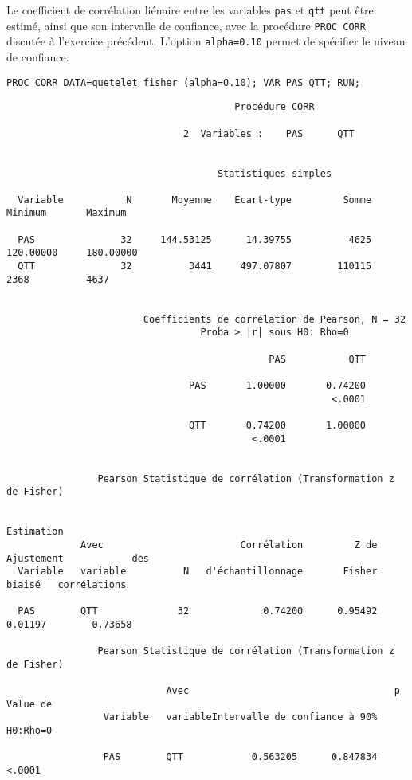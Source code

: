 Le coefficient de corrélation liénaire entre les variables \texttt{pas} et
\texttt{qtt} peut être estimé, ainsi que son intervalle de confiance, avec
la procédure \texttt{PROC CORR} discutée à l'exercice précédent. L'option
\texttt{alpha=0.10} permet de spécifier le niveau de confiance.
\begin{verbatim}
PROC CORR DATA=quetelet fisher (alpha=0.10); VAR PAS QTT; RUN;
\end{verbatim}

\begin{verbatim}
                                        Procédure CORR

                               2  Variables :    PAS      QTT


                                     Statistiques simples

  Variable           N       Moyenne    Ecart-type         Somme       Minimum       Maximum

  PAS               32     144.53125      14.39755          4625     120.00000     180.00000
  QTT               32          3441     497.07807        110115          2368          4637


                        Coefficients de corrélation de Pearson, N = 32
                                  Proba > |r| sous H0: Rho=0

                                              PAS           QTT

                                PAS       1.00000       0.74200
                                                         <.0001

                                QTT       0.74200       1.00000
                                           <.0001


                Pearson Statistique de corrélation (Transformation z de Fisher)

                                                                                   Estimation
             Avec                        Corrélation         Z de   Ajustement            des
  Variable   variable          N   d'échantillonnage       Fisher       biaisé   corrélations

  PAS        QTT              32             0.74200      0.95492      0.01197        0.73658

                Pearson Statistique de corrélation (Transformation z de Fisher)

                            Avec                                    p Value de
                 Variable   variableIntervalle de confiance à 90%     H0:Rho=0

                 PAS        QTT            0.563205      0.847834       <.0001
\end{verbatim}

